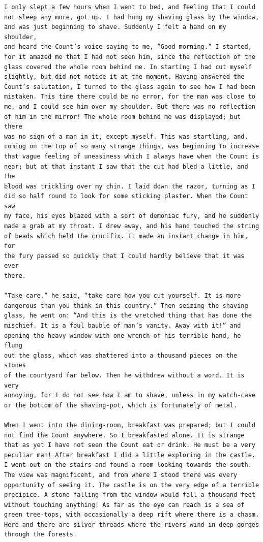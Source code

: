 \documentclass{article}
\begin{document}
\begin{verbatim}
I only slept a few hours when I went to bed, and feeling that I could
not sleep any more, got up. I had hung my shaving glass by the window,
and was just beginning to shave. Suddenly I felt a hand on my shoulder,
and heard the Count’s voice saying to me, “Good morning.” I started,
for it amazed me that I had not seen him, since the reflection of the
glass covered the whole room behind me. In starting I had cut myself
slightly, but did not notice it at the moment. Having answered the
Count’s salutation, I turned to the glass again to see how I had been
mistaken. This time there could be no error, for the man was close to
me, and I could see him over my shoulder. But there was no reflection
of him in the mirror! The whole room behind me was displayed; but there
was no sign of a man in it, except myself. This was startling, and,
coming on the top of so many strange things, was beginning to increase
that vague feeling of uneasiness which I always have when the Count is
near; but at that instant I saw that the cut had bled a little, and the
blood was trickling over my chin. I laid down the razor, turning as I
did so half round to look for some sticking plaster. When the Count saw
my face, his eyes blazed with a sort of demoniac fury, and he suddenly
made a grab at my throat. I drew away, and his hand touched the string
of beads which held the crucifix. It made an instant change in him, for
the fury passed so quickly that I could hardly believe that it was ever
there.

“Take care,” he said, “take care how you cut yourself. It is more
dangerous than you think in this country.” Then seizing the shaving
glass, he went on: “And this is the wretched thing that has done the
mischief. It is a foul bauble of man’s vanity. Away with it!” and
opening the heavy window with one wrench of his terrible hand, he flung
out the glass, which was shattered into a thousand pieces on the stones
of the courtyard far below. Then he withdrew without a word. It is very
annoying, for I do not see how I am to shave, unless in my watch-case
or the bottom of the shaving-pot, which is fortunately of metal.

When I went into the dining-room, breakfast was prepared; but I could
not find the Count anywhere. So I breakfasted alone. It is strange
that as yet I have not seen the Count eat or drink. He must be a very
peculiar man! After breakfast I did a little exploring in the castle.
I went out on the stairs and found a room looking towards the south.
The view was magnificent, and from where I stood there was every
opportunity of seeing it. The castle is on the very edge of a terrible
precipice. A stone falling from the window would fall a thousand feet
without touching anything! As far as the eye can reach is a sea of
green tree-tops, with occasionally a deep rift where there is a chasm.
Here and there are silver threads where the rivers wind in deep gorges
through the forests.


\end{verbatim}
\end{document}
